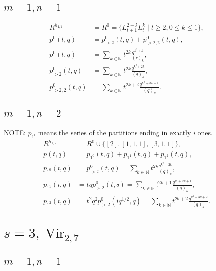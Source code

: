 \documentclass[a4paper, 12pt, reqno]{amsart}
\DeclareMathOperator{\Vir}{Vir}
\begin{document}
\subsection{$m = 1, n = 1$}
\label{sec:m-=-1}

\begin{align*}
  R^{h_{1, 1}} &= R^0 = \{L_{t + 1}^{2 - k}L_t^k \mid t \ge 2, 0 \le k \le 1\}, \\
  p^0(t, q) &= p^0_{>2}(t, q) + p^0_{>2, 2}(t, q), \\
  p^0(t, q) &= \sum_{k \in \mathbb{N}}t^{2k}\frac{q^{k^2 + k}}{(q)_k}, \\
  p^0_{>2}(t, q) &= \sum_{k \in \mathbb{N}}t^{2k}\frac{q^{k^2 + 2k}}{(q)_k}, \\
  p^0_{>2, 2}(t, q) &= \sum_{k \in \mathbb{N}}t^{2k + 2}\frac{q^{k^2 + 3k + 2}}{(q)_k}.
\end{align*}

\subsection{$m = 1, n = 2$}
\label{sec:m-=-1-1}

NOTE: $p_{1^i}$ means the series of the partitions ending in exactly $i$ ones.
\begin{align*}
  R^{h_{1, 2}} &= R^0 \cup \{[2], [1, 1, 1], [3, 1, 1]\}, \\
  p(t, q) &= p_{1^0}(t, q) + p_{1^1}(t, q) + p_{1^2}(t, q), \\
  p_{1^0}(t, q) &= p^0_{>2}(t, q) = \sum_{k \in \mathbb{N}}t^{2k}\frac{q^{k^2 + 2k}}{(q)_k}, \\
  p_{1^1}(t, q) &= tqp^0_{>2}(t, q) = \sum_{k \in \mathbb{N}}t^{2k + 1}\frac{q^{k^2 + 2k + 1}}{(q)_k}, \\
  p_{1^2}(t, q) &= t^2q^2p^0_{>2}(tq^{1/2}, q) = \sum_{k \in \mathbb{N}}t^{2k + 2}\frac{q^{k^2 + 3k + 2}}{(q)_k}.
\end{align*}

\section{$s = 3, \Vir_{2, 7}$}
\label{sec:s-=-3}

\subsection{$m = 1, n = 1$}
\label{sec:m-=-1-2}
\end{document}

